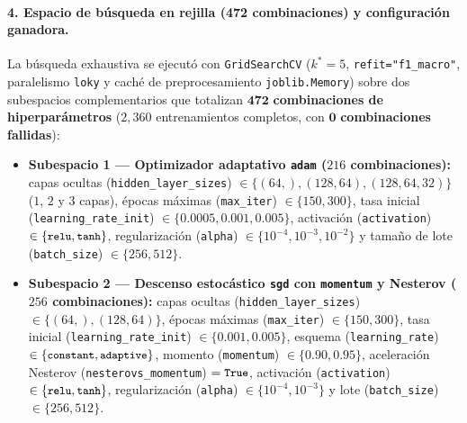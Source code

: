 \documentclass[11pt,a4paper]{article}
\newcommand{\code}[1]{\texttt{\small #1}}
\begin{document}
\paragraph{4. Espacio de búsqueda en rejilla (472 combinaciones) y configuración ganadora.}
La búsqueda exhaustiva se ejecutó con \code{GridSearchCV} ($k^* = 5$, \code{refit="f1\_macro"}, paralelismo \code{loky} y caché de preprocesamiento \code{joblib.Memory}) sobre dos subespacios complementarios que totalizan $\mathbf{472}$ \textbf{combinaciones de hiperparámetros} ($2{,}360$ entrenamientos completos, con $\mathbf{0}$ \textbf{combinaciones fallidas}):
\begin{itemize}[noitemsep,leftmargin=1.5em]
    \item \textbf{Subespacio 1 --- Optimizador adaptativo \code{adam} ($216$ combinaciones):} capas ocultas (\code{hidden\_layer\_sizes}) $\in \{(64,), (128, 64), (128, 64, 32)\}$ ($1$, $2$ y $3$ capas), épocas máximas (\code{max\_iter}) $\in \{150, 300\}$, tasa inicial (\code{learning\_rate\_init}) $\in \{0.0005, 0.001, 0.005\}$, activación (\code{activation}) $\in \{\text{\code{relu}}, \text{\code{tanh}}\}$, regularización (\code{alpha}) $\in \{10^{-4}, 10^{-3}, 10^{-2}\}$ y tamaño de lote (\code{batch\_size}) $\in \{256, 512\}$.
    \item \textbf{Subespacio 2 --- Descenso estocástico \code{sgd} con \code{momentum} y Nesterov ($256$ combinaciones):} capas ocultas (\code{hidden\_layer\_sizes}) $\in \{(64,), (128, 64)\}$, épocas máximas (\code{max\_iter}) $\in \{150, 300\}$, tasa inicial (\code{learning\_rate\_init}) $\in \{0.001, 0.005\}$, esquema (\code{learning\_rate}) $\in \{\text{\code{constant}}, \text{\code{adaptive}}\}$, momento (\code{momentum}) $\in \{0.90, 0.95\}$, aceleración Nesterov (\code{nesterovs\_momentum}) $= \text{\code{True}}$, activación (\code{activation}) $\in \{\text{\code{relu}}, \text{\code{tanh}}\}$, regularización (\code{alpha}) $\in \{10^{-4}, 10^{-3}\}$ y lote (\code{batch\_size}) $\in \{256, 512\}$.
\end{itemize}
\end{document}
